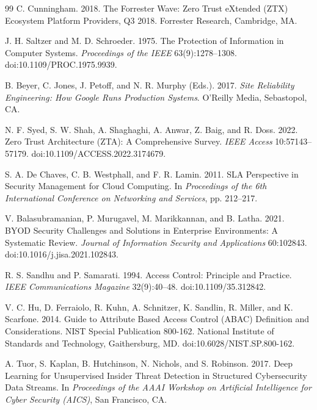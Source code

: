 \documentclass[unnumsec,webpdf,contemporary,large]{oup-authoring-template}
\theoremstyle{thmstyleone}
\theoremstyle{thmstyletwo}
\theoremstyle{thmstylethree}
\begin{document}
\begin{thebibliography}{99}
C. Cunningham. 2018. The Forrester Wave: Zero Trust eXtended (ZTX) Ecosystem
Platform Providers, Q3 2018. Forrester Research, Cambridge, MA.

J. H. Saltzer and M. D. Schroeder. 1975. The Protection of Information in Computer
Systems. \textit{Proceedings of the IEEE} 63(9):1278--1308. doi:10.1109/PROC.1975.9939.

B. Beyer, C. Jones, J. Petoff, and N. R. Murphy (Eds.). 2017. \textit{Site Reliability
Engineering: How Google Runs Production Systems}. O'Reilly Media, Sebastopol, CA.

N. F. Syed, S. W. Shah, A. Shaghaghi, A. Anwar, Z. Baig, and R. Doss. 2022. Zero
Trust Architecture (ZTA): A Comprehensive Survey. \textit{IEEE Access}
10:57143--57179. doi:10.1109/ACCESS.2022.3174679.

S. A. De Chaves, C. B. Westphall, and F. R. Lamin. 2011. SLA Perspective in Security
Management for Cloud Computing. In \textit{Proceedings of the 6th International
Conference on Networking and Services}, pp. 212--217.

V. Balasubramanian, P. Murugavel, M. Marikkannan, and B. Latha. 2021. BYOD Security
Challenges and Solutions in Enterprise Environments: A Systematic Review.
\textit{Journal of Information Security and Applications} 60:102843.
doi:10.1016/j.jisa.2021.102843.

R. S. Sandhu and P. Samarati. 1994. Access Control: Principle and Practice.
\textit{IEEE Communications Magazine} 32(9):40--48. doi:10.1109/35.312842.

V. C. Hu, D. Ferraiolo, R. Kuhn, A. Schnitzer, K. Sandlin, R. Miller, and K. Scarfone.
2014. Guide to Attribute Based Access Control (ABAC) Definition and Considerations.
NIST Special Publication 800-162. National Institute of Standards and Technology,
Gaithersburg, MD. doi:10.6028/NIST.SP.800-162.

A. Tuor, S. Kaplan, B. Hutchinson, N. Nichols, and S. Robinson. 2017. Deep Learning
for Unsupervised Insider Threat Detection in Structured Cybersecurity Data Streams.
In \textit{Proceedings of the AAAI Workshop on Artificial Intelligence for Cyber
Security (AICS)}, San Francisco, CA.


\end{thebibliography}
\end{document}
